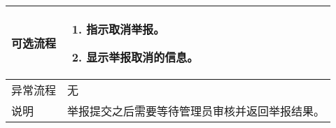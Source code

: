 \begin{table}[htbp]
\begin{tabular}{|l|l|l|l|}
        \hline
        可选流程                          & \multicolumn{3}{l|}{\begin{minipage}[t]{0.8\textwidth}
                \begin{enumerate}[nosep]
                    \item 指示取消举报。
                    \item 显示举报取消的信息。
                          \vspace{0.5em}
                \end{enumerate}
            \end{minipage}  }                                                                                                                                                             \\
        \hline
        异常流程                          & \multicolumn{3}{l|}{   无}                                                                                                                                                                                    \\
        \hline
        说明                              & \multicolumn{3}{l|}{举报提交之后需要等待管理员审核并返回举报结果。    }                                                                                                                                       \\
        \hline
    \end{tabular}
\end{table}

